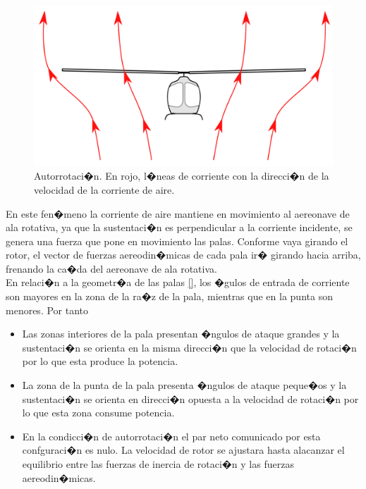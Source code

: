 \documentclass[10pt,a4paper]{book}
\begin{document}
\begin{figure}[H]
	\centering
		\includegraphics[scale=0.27]{Imagenes/Autorrotacion.png}
	\caption{Autorrotaci�n. En rojo, l�neas de corriente con la direcci�n de la velocidad de la corriente de aire.}
	\label{img:Autorrotacion}
\end{figure}

En este fen�meno la corriente de aire mantiene en movimiento al aereonave de ala rotativa, ya que la sustentaci�n es perpendicular a la corriente incidente, se genera una fuerza que pone en movimiento las palas. Conforme vaya girando el rotor, el vector de fuerzas aereodin�micas de cada pala ir� girando hacia arriba, frenando la ca�da del aereonave de ala rotativa.\\

En relaci�n a la geometr�a de las palas \ref{}, los �gulos de entrada de corriente son mayores en la zona de la ra�z de la pala, mientras que en  la punta son menores. Por tanto 
\begin{itemize}
\item Las zonas interiores de la pala presentan �ngulos de ataque grandes y la sustentaci�n se orienta en la misma direcci�n que la velocidad de rotaci�n por lo que esta produce la potencia.
\item La zona de la punta de la pala presenta �ngulos de ataque peque�os y la sustentaci�n se orienta en direcci�n opuesta a la velocidad de rotaci�n por lo que esta zona consume potencia.
\item En la condicci�n de autorrotaci�n el par neto comunicado por esta confguraci�n es nulo. La velocidad de rotor se ajustara hasta alacanzar el equilibrio entre las fuerzas de inercia de rotaci�n y las fuerzas aereodin�micas.
\end{itemize}
 
\end{document}
